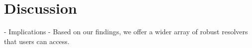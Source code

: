 \section{Discussion}\label{sec:discussion}
- Implications
	- Based on our findings, we offer a wider array of robust resolvers that users can access. 

